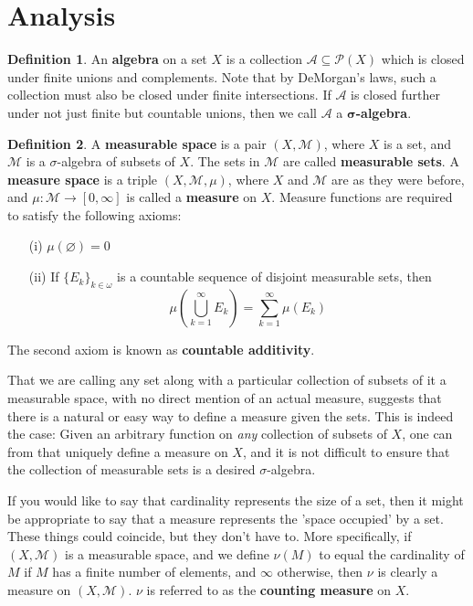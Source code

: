 \documentclass{article}
\theoremstyle{definition}
\newtheorem{definition}{Definition}[section]
\theoremstyle{plain}
\theoremstyle{theorem}
\begin{document}
\section{Analysis}
\begin{definition}
	An \textbf{algebra} on a set $X$ is a collection $\mathcal{A} \subseteq \mathcal{P}(X)$ which is closed under finite unions and complements. Note that by DeMorgan's laws, such a collection must also be closed under finite intersections. If $\mathcal{A}$ is closed further under not just finite but countable unions, then we call $\mathcal{A}$ a $\bm{\sigma}$\textbf{-algebra}.
\end{definition}
\begin{definition}
	A \textbf{measurable space} is a pair $(X,\mathcal{M})$, where $X$ is a set, and $\mathcal{M}$ is a $\sigma$-algebra of subsets of $X$. The sets in $\mathcal{M}$ are called \textbf{measurable sets}. A \textbf{measure space} is a triple $(X,\mathcal{M},\mu)$, where $X$ and $\mathcal{M}$ are as they were before, and $\mu:\mathcal{M} \to [0,\infty]$ is called a \textbf{measure} on $X$. Measure functions are required to satisfy the following axioms:
	\begin{itemize}
		\item[(i)] $\mu(\varnothing) = 0$
		\item[(ii)] If $\{E_k\}_{k \in \omega}$ is a countable sequence of disjoint measurable sets, then 
		\[ \mu \left( \bigcup_{k=1}^{\infty}E_k \right) = \sum_{k=1}^{\infty} \mu(E_k) \]
	\end{itemize}
	The second axiom is known as \textbf{countable additivity}.
\end{definition}
That we are calling any set along with a particular collection of subsets of it a measurable space, with no direct mention of an actual measure, suggests that there is a natural or easy way to define a measure given the sets. This is indeed the case: Given an arbitrary function on \textit{any} collection of subsets of $X$, one can from that uniquely define a measure on $X$, and it is not difficult to ensure that the collection of measurable sets is a desired $\sigma$-algebra. 
\par If you would like to say that cardinality represents the size of a set, then it might be appropriate to say that a measure represents the 'space occupied' by a set. These things could coincide, but they don't have to. More specifically, if $(X,\mathcal{M})$ is a measurable space, and we define $\nu(M)$ to equal the cardinality of $M$ if $M$ has a finite number of elements, and $\infty$ otherwise, then $\nu$ is clearly a measure on $(X,\mathcal{M})$. $\nu$ is referred to as the \textbf{counting measure} on $X$. 
\end{document}
